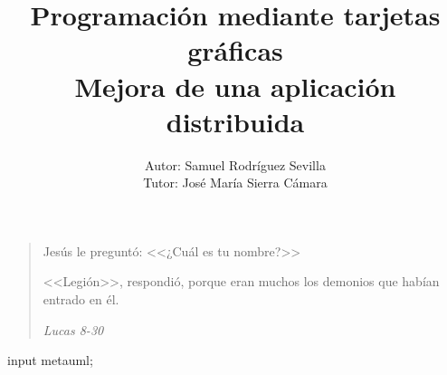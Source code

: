 \documentclass[12pt]{book}
\begin{document}
	
	\title{Programación mediante tarjetas gráficas\\Mejora de una aplicación distribuida}
	\author{Autor: Samuel Rodríguez Sevilla\\Tutor: José María Sierra Cámara}
	
	\maketitle
	
	\section*{}
	\pagebreak\newpage

	\vspace*{\fill}
	\begin{quote}
		Jesús le preguntó: <<¿Cuál es tu nombre?>>
		
		<<Legión>>, respondió, porque eran muchos los demonios que habían entrado en él.
		
		\emph{Lucas 8-30}
	\end{quote}
	\vspace*{\fill}
	
	\tableofcontents
	\listoffigures
	
	\begin{empfile}
	\begin{empcmds}
	input metauml;
	\end{empcmds}
	
	
	
	
	
	
	
	\appendix
	
	
	
	
	
	
	\end{empfile}
	
	
\end{document}
